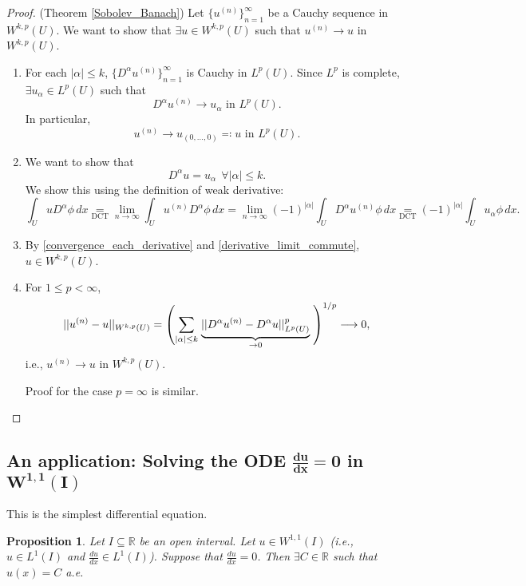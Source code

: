 \documentclass[12pt]{article}
\newtheorem{proposition}{Proposition}[section]
\theoremstyle{definition}
\begin{document}
\begin{proof}
(Theorem \ref{Sobolev_Banach}) Let $\{u^{(n)}\}_{n=1}^\infty$ be a Cauchy sequence in $W^{k,p}(U)$. We want to show that $\exists u\in W^{k,p}(U)$ such that $u^{(n)}\rightarrow u$ in $W^{k,p}(U)$.

\begin{enumerate}[label=\arabic*.]
\item\label{convergence_each_derivative} For each $|\alpha|\leq k$, $\{D^\alpha u^{(n)}\}_{n=1}^\infty$ is Cauchy in $L^p(U)$. Since $L^p$ is complete, $\exists u_\alpha\in L^p(U)$ such that
\[D^\alpha u^{(n)}\longrightarrow u_\alpha\text{ in }L^p(U).\]
In particular,
\[u^{(n)}\longrightarrow u_{(0,\ldots,0)}\eqqcolon u\text{ in }L^p(U).\]

\item\label{derivative_limit_commute} We want to show that
\[D^\alpha u=u_\alpha\ \ \forall|\alpha|\leq k.\]
We show this using the definition of weak derivative:
\[\int_UuD^\alpha\phi\,dx\underset{\text{DCT}}=\lim_{n\to\infty}\int_Uu^{(n)}D^\alpha\phi\,dx=\lim_{n\to\infty}(-1)^{|\alpha|}\int_UD^\alpha u^{(n)}\phi\,dx\underset{\text{DCT}}=(-1)^{|\alpha|}\int_Uu_\alpha\phi\,dx.\]

\item By \ref{convergence_each_derivative} and \ref{derivative_limit_commute}, $u\in W^{k,p}(U)$.

\item For $1\leq p<\infty$,
\[||u^{(n)}-u||_{W^{k,p}(U)}=\left(\sum_{|\alpha|\leq k}\right.\underbrace{||D^\alpha u^{(n)}-D^\alpha u||_{L^p(U)}^p}_{\to0}\left.\vphantom{\sum_{|\alpha|\leq k}}\right)^{1/p}\longrightarrow0,\]
i.e., $u^{(n)}\rightarrow u$ in $W^{k,p}(U)$.

Proof for the case $p=\infty$ is similar.
\end{enumerate}
\end{proof}

\subsection[An application: Solving the ODE \texorpdfstring{$\frac{du}{dx}=0$}{du/dx} in \texorpdfstring{$W^{1,1}(I)$}{the 1D Sobolev space}]{An application: Solving the ODE \texorpdfstring{$\boldsymbol{\frac{du}{dx}=0}$}{du/dx} in \texorpdfstring{$\boldsymbol{W^{1,1}(I)}$}{the 1D Sobolev space}}
This is the simplest differential equation.

\begin{proposition}
Let $I\subseteq\mathbb R$ be an open interval. Let $u\in W^{1,1}(I)$ (i.e., $u\in L^1(I)$ and $\frac{du}{dx}\in L^1(I)$). Suppose that $\frac{du}{dx}=0$. Then $\exists C\in\mathbb R$ such that $u(x)=C$ a.e.
\end{proposition}
\end{document}
